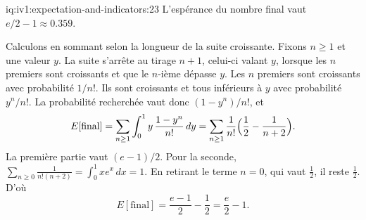 \begin{solution}{iq:iv1:expectation-and-indicators:23}
L'espérance du nombre final vaut $e/2 - 1 \approx 0.359$.

Calculons en sommant selon la longueur de la suite croissante. Fixons $n \ge 1$ et une valeur $y$. La suite s'arrête au tirage $n+1$, celui-ci valant $y$, lorsque les $n$ premiers sont croissants et que le $n$-ième dépasse $y$. Les $n$ premiers sont croissants avec probabilité $1/n!$. Ils sont
croissants et tous inférieurs à $y$ avec probabilité $y^n/n!$. La probabilité recherchée vaut donc $(1 - y^n)/n!$, et
\[
E[\text{final}] = \sum_{n \ge 1} \int_0^1 y\,\frac{1 - y^n}{n!}\,dy = \sum_{n \ge 1} \frac{1}{n!}\Bigl(\frac12 - \frac{1}{n+2}\Bigr).
\]
La première partie vaut $(e-1)/2$. Pour la seconde, $\sum_{n \ge 0} \frac{1}{n!(n+2)} = \int_0^1 x e^x\,dx = 1$. En retirant le terme $n = 0$, qui vaut $\tfrac12$, il reste $\tfrac12$. D'où
\[
E[\text{final}] = \frac{e - 1}{2} - \frac12 = \frac{e}{2} - 1.
\]
\end{solution}

